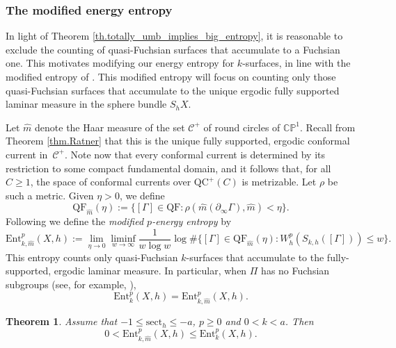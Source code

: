 \documentclass[11pt]{article}
\newcommand{\ksurfaces}{$k$\nobreakdash-surfaces\xspace}
\theoremstyle{plain}
\newtheorem{theorem}{Theorem}[section]
\theoremstyle{definition}
\newcommand{\C}{{\mathbb C}}
\newcommand{\PP}{{\mathbb P}}
\newcommand{\cC}{{\mathcal C}}
\newcommand{\sect}{\mathrm{sect}}
\newcommand{\Ent}{\mathrm{Ent}}
\newcommand{\QF}{\mathrm{QF}}
\newcommand{\QC}{\mathrm{QC}}
\newcommand{\bord}{\partial_{\infty}}
\begin{document}
\subsubsection{The modified energy entropy}\label{sss.Modified_entropy}
In light of Theorem \ref{th.totally_umb_implies_big_entropy}, it is reasonable to exclude the counting of quasi-Fuchsian surfaces that accumulate to a Fuchsian one. This motivates modifying our energy entropy for \ksurfaces, in line with the modified entropy of \cite{MN_currents}. This modified entropy will focus on counting only those quasi-Fuchsian surfaces that accumulate to the unique ergodic fully supported laminar measure in the sphere bundle $S_hX$.

Let $\hat m$ denote the Haar measure of the set $\cC^+$ of round circles of $\C\PP^1$. Recall from Theorem \ref{thm.Ratner} that this is the unique fully supported, ergodic conformal current in~$\cC^+$. Note now that every conformal current is determined by its restriction to some compact fundamental domain, and it follows that, for all $C\geq 1$, the space of conformal currents over $\QC^+(C)$ is metrizable. Let $\rho$ be such a metric. Given $\eta>0$, we define
\begin{equation*}
\QF_{\hat m}(\eta):=\bigl\{[\Gamma]\in\QF:\rho(\hat m(\bord\Gamma),\hat m)<\eta\bigr\}.
\end{equation*}
Following \cite{MN_currents} we define the \emph{modified $p$-energy entropy} by
\begin{equation*}
\Ent^p_{k,\hat m}(X,h):=\lim_{\eta\to 0}\liminf_{w\to\infty}\frac{1}{w\log w}\log\#\bigl\{[\Gamma]\in\QF_{\hat m}(\eta):W^{p}_{h}(S_{k,h}([\Gamma]))\leq w\bigr\}.
\end{equation*}
This entropy counts only quasi-Fuchsian \ksurfaces that accumulate to the fully-supported, ergodic laminar measure. In particular, when $\Pi$ has no Fuchsian subgroups (see, for example, \cite[\S 5.3]{MR03}),
\begin{equation*}
\Ent^{p}_{k}(X,h)=\Ent^{p}_{k,\hat m}(X,h).
\end{equation*}

\begin{theorem}
Assume that $-1\leq\sect_h\leq-a$, $p\geq 0$ and $0<k<a$. Then
\begin{equation*}
0<\Ent^{p}_{k,\hat m}(X,h)\leq\Ent^{p}_{k}(X,h).
\end{equation*}
\end{theorem}
\end{document}
